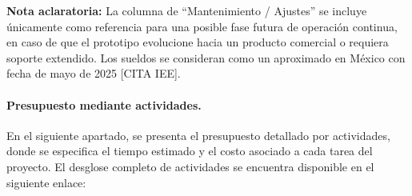 \begin{table}[H]
	\centering
	\renewcommand{\arraystretch}{1.5}
	\setlength{\tabcolsep}{10pt}
	\caption{Costos estimados de sueldos y asesorías en un entorno comercial durante el creación del prototipo.}
	\label{tab:sueldos_comercial}
\end{table}


\noindent \textbf{Nota aclaratoria:}  
La columna de “Mantenimiento / Ajustes” se incluye únicamente como referencia para una posible fase futura de operación continua, en caso de que el prototipo evolucione hacia un producto comercial o requiera soporte extendido. Los sueldos se consideran como un aproximado en México con fecha de mayo de 2025 [CITA IEE].  


\paragraph{\textbf{Presupuesto mediante actividades.}} 
En el siguiente apartado, se presenta el presupuesto detallado por actividades, donde se especifica el tiempo estimado y el costo asociado a cada tarea del proyecto.
El desglose completo de actividades se encuentra disponible en el siguiente enlace:

